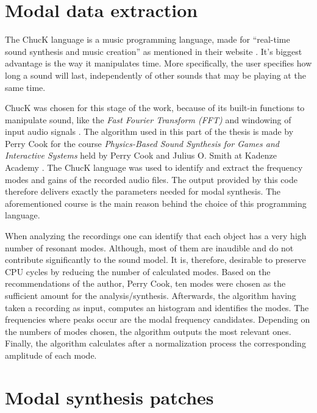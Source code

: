 \section{Modal data extraction}\label{sec:chuck}

The ChucK language is a music programming language, made for ``real-time sound synthesis and music creation'' as mentioned in their website \cite{bib:chuck}. It's biggest advantage is the way it manipulates time. More specifically, the user specifies how long a sound will last, independently of other sounds that may be playing at the same time.

ChucK was chosen for this stage of the work, because of its built-in functions to manipulate sound, like the \textit{Fast Fourier Transform (FFT)} and windowing of input audio signals \cite{bib:chuck_doc}. The algorithm used in this part of the thesis is made by Perry Cook for the course \textit{Physics-Based Sound Synthesis for Games and Interactive Systems} held by Perry Cook and Julius O. Smith at Kadenze Academy \cite{bib:physicsbasedcourse}. The ChucK language was used to identify and extract the frequency modes and gains of the recorded audio files. The output provided by this code therefore delivers exactly the parameters needed for modal synthesis. The aforementioned course is the main reason behind the choice of this programming language.

When analyzing the recordings one can identify that each object has a very high number of resonant modes. Although, most of them are inaudible and do not contribute significantly to the sound model. It is, therefore, desirable to preserve CPU cycles by reducing the number of calculated modes. Based on the recommendations of the author, Perry Cook, ten modes were chosen as the sufficient amount for the analysis/synthesis. Afterwards, the algorithm having taken a recording as input, computes an histogram and identifies the modes. The frequencies where peaks occur are the modal frequency candidates. Depending on the numbers of modes chosen, the algorithm outputs the most relevant ones. Finally, the algorithm calculates after a normalization process the corresponding amplitude of each mode.


 
\section{Modal synthesis patches}

